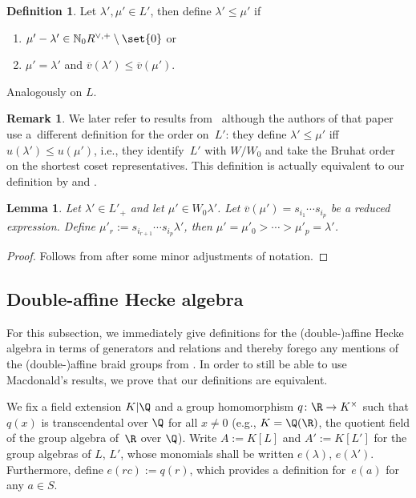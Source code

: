 \documentclass[10pt,a4paper]{amsart}
\newtheorem{Lemma}[Theorem]{Lemma}
\theoremstyle{definition}
\newtheorem{Definition}[Theorem]{Definition}
\newtheorem{Remark}[Theorem]{Remark}
\numberwithin{equation}{section}
\begin{document}
\begin{Definition}
 Let $\lambda',\mu'\in L'$, then define $\lambda'\le\mu'$ if
 \begin{enumerate}\itemsep=0pt
 \item[(i)] $\mu'-\lambda'\in\mathbb{N}_0 R^{\vee,+}\setminus\set{0}$ or
 \item[(ii)] $\mu'=\lambda'$ and $\overline{v}(\lambda')\le\overline{v}(\mu')$.
 \end{enumerate}
 Analogously on $L$.
\end{Definition}

\begin{Remark}
 We later refer to results from~\cite{stokmanInduced} although the authors
 of that paper use a~different definition for the order on~$L'$: they define
 $\lambda'\le\mu'$ iff $u(\lambda')\le u(\mu')$, i.e., they identify~$L'$
 with $W/W_0$ and take the Bruhat order on the shortest coset representatives.
 This definition is actually equivalent to our definition by
\cite[Proposition~5.21]{stokmanInduced} and \cite[Section~2.7.13]{macdonald}.
\end{Remark}

\begin{Lemma}\label{sec:lem-order-interval}
 Let $\lambda'\in L'_+$ and let $\mu'\in W_0\lambda'$. Let
 $\overline{v}(\mu')=s_{i_1}\cdots s_{i_p}$ be a reduced expression. Define
 $\mu'_r := s_{i_{r+1}}\cdots s_{i_p}\lambda'$, then
$
 \mu'=\mu'_0>\cdots>\mu'_p = \lambda'$.
\end{Lemma}
\begin{proof}
 Follows from \cite[Section~2.7.10\,(ii)]{macdonald} after some minor adjustments
 of notation.
\end{proof}

\subsection{Double-affine Hecke algebra}
For this subsection, we immediately give definitions for the (double-)affine
Hecke algebra in terms of generators and relations and thereby forego any mentions of the (double-)affine braid groups from \cite[Section~3]{macdonald}.
In order to still be able to use Macdonald's results, we prove that our definitions are equivalent.

We fix a field extension $K|\Q$ and a group homomorphism $q\colon \R\to K^\times$ such that $q(x)$ is transcendental over $\Q$ for all $x\ne0$
(e.g., $K=\Q(\R)$, the quotient field of the group algebra of~$\R$ over $\Q$). Write $A:= K[L]$ and $A':= K[L']$
for the group algebras of $L$, $L'$, whose monomials shall be written $e(\lambda)$, $e(\lambda')$. Furthermore, define $e(rc):=q(r)$, which provides
a definition for~$e(a)$ for any $a\in S$.
\end{document}

